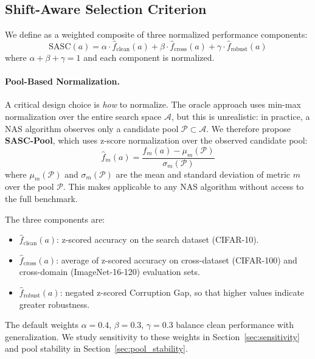 \subsection{Shift-Aware Selection Criterion}
\label{sec:sasc}

We define \sasc as a weighted composite of three normalized performance components:
\begin{equation}
    \text{SASC}(a) = \alpha \cdot \hat{f}_\text{clean}(a) + \beta \cdot \hat{f}_\text{cross}(a) + \gamma \cdot \hat{f}_\text{robust}(a)
    \label{eq:sasc}
\end{equation}
where $\alpha + \beta + \gamma = 1$ and each component is normalized.

\paragraph{Pool-Based Normalization.}
A critical design choice is \emph{how} to normalize.
The oracle approach uses min-max normalization over the entire search space $\mathcal{A}$, but this is unrealistic: in practice, a NAS algorithm observes only a candidate pool $\mathcal{P} \subset \mathcal{A}$.
We therefore propose \textbf{SASC-Pool}, which uses z-score normalization over the observed candidate pool:
\begin{equation}
    \hat{f}_m(a) = \frac{f_m(a) - \mu_m(\mathcal{P})}{\sigma_m(\mathcal{P})}
    \label{eq:zscore}
\end{equation}
where $\mu_m(\mathcal{P})$ and $\sigma_m(\mathcal{P})$ are the mean and standard deviation of metric $m$ over the pool $\mathcal{P}$.
This makes \sasc applicable to any NAS algorithm without access to the full benchmark.

The three components are:
\begin{itemize}
    \item $\hat{f}_\text{clean}(a)$: z-scored accuracy on the search dataset (CIFAR-10).
    \item $\hat{f}_\text{cross}(a)$: average of z-scored accuracy on cross-dataset (CIFAR-100) and cross-domain (ImageNet-16-120) evaluation sets.
    \item $\hat{f}_\text{robust}(a)$: negated z-scored Corruption Gap, so that higher values indicate greater robustness.
\end{itemize}

The default weights $\alpha{=}0.4$, $\beta{=}0.3$, $\gamma{=}0.3$ balance clean performance with generalization. We study sensitivity to these weights in Section~\ref{sec:sensitivity} and pool stability in Section~\ref{sec:pool_stability}.

